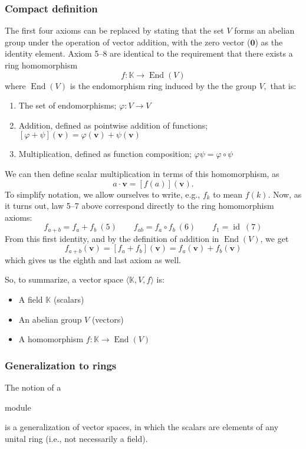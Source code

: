 \documentclass{article}
\DeclareMathOperator{\End}{End}
\DeclareMathOperator{\id}{id}
\newenvironment{itemized}{
\begin{itemize}
\setlength{\itemsep}{0pt}
\setlength{\parskip}{0pt}
\setlength{\parsep}{0pt}
}{\end{itemize}}
\newenvironment{enumerated}{
\begin{enumerate}
\setlength{\itemsep}{0pt}
\setlength{\parskip}{0pt}
\setlength{\parsep}{0pt}
}{\end{enumerate}}
\renewcommand{\vec}[1]{\mathbf{#1}}
\begin{document}
\subsubsection*{Compact definition}

The first four axioms can be replaced by stating that the set $V$ forms an abelian group under the operation of vector addition, with the zero vector ($\vec{0}$) as the identity element.
Axiom 5--8 are identical to the requirement that there exists a ring homomorphism
$$ f : \mathbb{K} \rightarrow \End(V) $$
where $\End(V)$ is the endomorphism ring induced by the the group $V,$ that is:
\begin{enumerated}
  \item The set of endomorphisms; $\varphi : V \rightarrow V$
  \item Addition, defined as pointwise addition of functions; $ \left[\varphi + \psi\right](\vec{v}) = \varphi(\vec{v}) + \psi(\vec{v})$
  \item Multiplication, defined as function composition; $ \varphi\psi = \varphi \circ \psi$
\end{enumerated}
We can then define scalar multiplication in terms of this homomorphism, as
$$ a \cdot \vec{v} = [f(a)](\vec{v}). $$
To simplify notation, we allow ourselves to write, e.g., $f_k$ to mean $f(k)$.
Now, as it turns out, law 5--7 above correspond directly to the ring homomorphism axioms:
$$
f_{a + b} = f_a + f_b \ (5) \quad \quad
f_{ab} = f_a \circ f_b \ (6) \quad \quad
f_1 = \id \ (7)
$$
From this first identity, and by the definition of addition in $\End(V)$, we get
$$ f_{a + b}(\vec{v}) = [f_a + f_b](\vec{v}) = f_a(\vec{v}) + f_b(\vec{v}) $$
which gives us the eighth and last axiom as well.

So, to summarize, a vector space $\langle \mathbb{K}, V, f \rangle$ is:
\begin{itemized}
  \item A field $\mathbb{K}$ (scalars)
  \item An abelian group $V$ (vectors)
  \item A homomorphism $f : \mathbb{K} \rightarrow \End(V)$
\end{itemized}

\subsubsection*{Generalization to rings}
The notion of a \begin{em}module\end{em} is a generalization of vector spaces, in which the scalars are elements of any unital ring (i.e., not necessarily a field).
\end{document}
